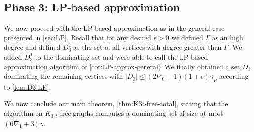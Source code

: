 
\subsection{Phase 3: LP-based approximation}\label{sec:LP-planar}
%
%
%
%
%
%

We now proceed with the LP-based approximation as in the general case
presented in \cref{sec:LP}. Recall that for any desired $\epsilon>0$
we defined $\Gamma$ as an high degree and defined
$D_3^1$ as the set of all vertices with degree greater than $\Gamma$.
We added $D_3^1$ to the dominating set and were able to call the
LP-based approximation algorithm of \cref{cor:LP-approx-general}. We finally
obtained a set $D_3$ dominating the remaining vertices with
$|D_3|\leq (2\nabla_0+1)(1+\epsilon)\gamma_R$ according to \cref{lem:D3-LP}.


We now conclude our main theorem, \cref{thm:K3t-free-total}, stating
that the algorithm on $K_{3,t}$-free graphs computes a dominating
set of size at most $(6\nabla_1+3)\gamma$.

